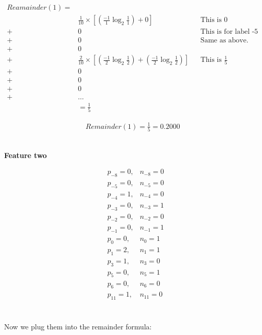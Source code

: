 \documentclass[12pt]{article}
\begin{document}
\begin{center}

\begin{align*}
Reamainder(1) =\\
&\frac{1}{10} \times [(\frac{-1}{1}\log_{2}{\frac{1}{1}}) + 0] &&\text{This is 0}\\
+ &0 &&\text{This is for label -5 which is also 0.} \\
+ &0 &&\text{Same as above.}\\
+ &0\\
+ &\frac{2}{10} \times [(\frac{-1}{2}\log_{2}{\frac{1}{2}}) + (\frac{-1}{2}\log_{2}{\frac{1}{2}})] &&\text{This is } \frac{1}{5}\\
+ &0\\
+ &0\\
+ &0 \\
+ &\ldots\\
&=  \frac{1}{5}
\end{align*}

\begin{align*}
Remainder(1) = \frac{1}{5} = 0.2000
\end{align*}
\\[0.1 in]
\end{center}

\noindent
\textbf{Feature two}
\begin{center}


\begin{align*}
&p_{-8}=0, &n_{-8}=0\\
&p_{-5}=0, &n_{-5}=0\\
&p_{-4}=1, &n_{-4}=0\\
&p_{-3}=0, &n_{-3}=1\\
&p_{-2}=0, &n_{-2}=0\\
&p_{-1}=0 ,&n_{-1}=1\\
&p_{0}=0, &n_{0}=1\\
&p_{1}=2, &n_{1}=1\\
&p_{3}=1, &n_{3}=0\\
&p_{5}=0, &n_{5}=1\\
&p_{6}=0, &n_{6}=0\\
&p_{11}=1, &n_{11}=0\\
\end{align*}
\\[0.1 in]
\end{center}

\noindent

Now we plug them into the remainder formula:
\end{document}
